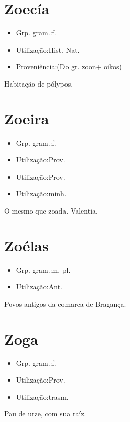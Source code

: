 \section{Zoecía}
\begin{itemize}
\item {Grp. gram.:f.}
\end{itemize}
\begin{itemize}
\item {Utilização:Hist. Nat.}
\end{itemize}
\begin{itemize}
\item {Proveniência:(Do gr. \textunderscore zoon\textunderscore  + \textunderscore oikos\textunderscore )}
\end{itemize}
Habitação de pólypos.
\section{Zoeira}
\begin{itemize}
\item {Grp. gram.:f.}
\end{itemize}
\begin{itemize}
\item {Utilização:Prov.}
\end{itemize}
\begin{itemize}
\item {Utilização:Prov.}
\end{itemize}
\begin{itemize}
\item {Utilização:minh.}
\end{itemize}
O mesmo que \textunderscore zoada\textunderscore .
Valentia.
\section{Zoélas}
\begin{itemize}
\item {Grp. gram.:m. pl.}
\end{itemize}
\begin{itemize}
\item {Utilização:Ant.}
\end{itemize}
Povos antigos da comarca de Bragança.
\section{Zoga}
\begin{itemize}
\item {Grp. gram.:f.}
\end{itemize}
\begin{itemize}
\item {Utilização:Prov.}
\end{itemize}
\begin{itemize}
\item {Utilização:trasm.}
\end{itemize}
Pau de urze, com sua raíz.
